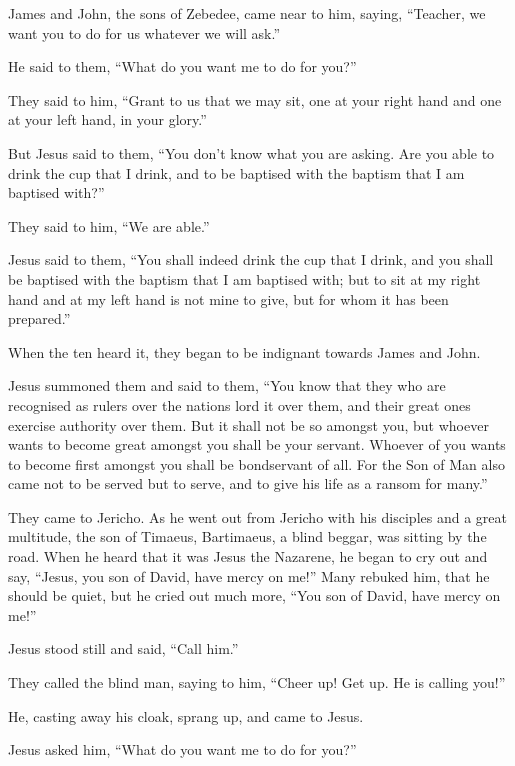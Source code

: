  James and John, the sons of Zebedee, came near to him,
saying, ``Teacher, we want you to do for us whatever we will ask.''

 He said to them, ``What do you want me to do for you?''

 They said to him, ``Grant to us that we may sit, one at
your right hand and one at your left hand, in your glory.''

 But Jesus said to them, ``You don't know what you are
asking. Are you able to drink the cup that I drink, and to be baptised
with the baptism that I am baptised with?''

 They said to him, ``We are able.''

Jesus said to them, ``You shall indeed drink the cup that I drink, and
you shall be baptised with the baptism that I am baptised with;
 but to sit at my right hand and at my left hand is not
mine to give, but for whom it has been prepared.''

 When the ten heard it, they began to be indignant towards
James and John.

 Jesus summoned them and said to them, ``You know that they
who are recognised as rulers over the nations lord it over them, and
their great ones exercise authority over them.  But it
shall not be so amongst you, but whoever wants to become great amongst
you shall be your servant.  Whoever of you wants to become
first amongst you shall be bondservant of all.  For the Son
of Man also came not to be served but to serve, and to give his life as
a ransom for many.''

 They came to Jericho. As he went out from Jericho with his
disciples and a great multitude, the son of Timaeus, Bartimaeus, a blind
beggar, was sitting by the road.  When he heard that it was
Jesus the Nazarene, he began to cry out and say, ``Jesus, you son of
David, have mercy on me!''  Many rebuked him, that he
should be quiet, but he cried out much more, ``You son of David, have
mercy on me!''

 Jesus stood still and said, ``Call him.''

They called the blind man, saying to him, ``Cheer up! Get up. He is
calling you!''

 He, casting away his cloak, sprang up, and came to Jesus.

 Jesus asked him, ``What do you want me to do for you?''

